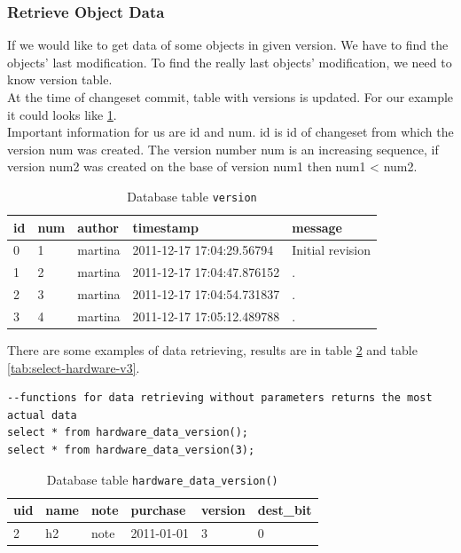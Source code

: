 \documentclass[deska]{subfiles}
\begin{document}
\subsubsection{Retrieve Object Data}

If we would like to get data of some objects in given version. We have to find the objects' last modification. To find the really last objects' modification, we need to know version table.\\
At the time of changeset commit, table with versions is updated. For our example it could looks like \ref{tab:example-version}.\\
Important information for us are id and num. id is id of changeset from which the version num was created. The version number num is an increasing sequence, if version num2 was created on the base of version num1 then num1 < num2.


\begin{longtable}{ l | l | l | l | l }
    \caption{Database table {\tt version}}
    \label{tab:example-version} \\
    id & num & author & timestamp & message\\
    \hline
    \endhead
    0 & 1 & martina & 2011-12-17 17:04:29.56794 & Initial revision\\
    1 & 2 & martina & 2011-12-17 17:04:47.876152 & .\\
    2 & 3 & martina & 2011-12-17 17:04:54.731837 & .\\
    3 & 4 & martina & 2011-12-17 17:05:12.489788 & .\\
    \hline
\end{longtable}


There are some examples of data retrieving, results are in table \ref{tab:select-hardware} and table \ref{tab:select-hardware-v3}.\\

\begin{verbatim}
--functions for data retrieving without parameters returns the most actual data
select * from hardware_data_version();
select * from hardware_data_version(3);
\end{verbatim}

\begin{longtable}{ l | l | l | l | l | l }
    \caption{Database table {\tt hardware\_data\_version()}}
    \label{tab:select-hardware} \\
    uid & name & note & purchase & version & dest\_bit\\
    \hline
    \endhead
    2 & h2 & note & 2011-01-01 & 3 & 0\\
    \hline
\end{longtable}
\end{document}
